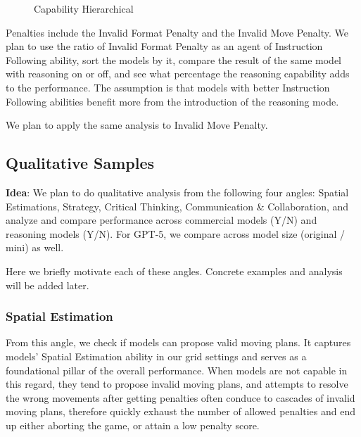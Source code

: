 \documentclass[../main.tex]{subfiles}
\begin{document}
\begin{figure}[ht]
\centering
{}
\caption{Capability Hierarchical}
\label{fig:capabilities-hierarchy}
\end{figure}

Penalties include the Invalid Format Penalty and the Invalid Move Penalty. We plan to use the ratio of Invalid Format Penalty as an agent of Instruction Following ability, sort the models by it, compare the result of the same model with reasoning on or off, and see what percentage the reasoning capability adds to the performance. The assumption is that models with better Instruction Following abilities benefit more from the introduction of the reasoning mode. 

We plan to apply the same analysis to Invalid Move Penalty. 

\subsection{Qualitative Samples} 

\textbf{Idea}: 
We plan to do qualitative analysis from the following four angles: Spatial Estimations, Strategy, Critical Thinking, Communication \& Collaboration, and analyze and compare performance across commercial models (Y/N) and reasoning models (Y/N). For GPT-5, we compare across model size (original / mini) as well. 

Here we briefly motivate each of these angles. Concrete examples and analysis will be added later. 

\subsubsection{Spatial Estimation}
From this angle, we check if models can propose valid moving plans. It captures models' Spatial Estimation ability in our grid settings and serves as a foundational pillar of the overall performance. When models are not capable in this regard, they tend to propose invalid moving plans, and attempts to resolve the wrong movements after getting penalties often conduce to cascades of invalid moving plans, therefore quickly exhaust the number of allowed penalties and end up either aborting the game, or attain a low penalty score. 
\end{document}
